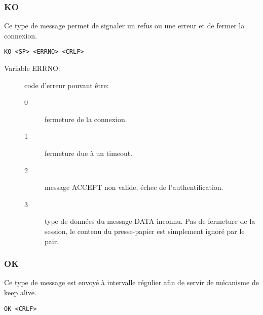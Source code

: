 \hrulefill

\subsubsection*{KO}
Ce type de message permet de signaler un refus ou une erreur et de fermer
la connexion.
\begin{verbatim}
KO <SP> <ERRNO> <CRLF>
\end{verbatim}
\begin{description}
\item[Variable ERRNO:] code d'erreur pouvant être:
  \begin{description}
  \item[0] fermeture de la connexion.
  \item[1] fermeture due à un timeout.
  \item[2] message ACCEPT non valide, échec de l'authentification.
  \item[3] type de données du message DATA inconnu. Pas de fermeture de la
    session, le contenu du presse-papier est simplement ignoré par le pair.
  \end{description}
\end{description}

\hrulefill

\subsubsection*{OK}
Ce type de message est envoyé à intervalle régulier afin de servir de
mécanisme de keep alive.
\begin{verbatim}
OK <CRLF>
\end{verbatim}

\hrulefill

